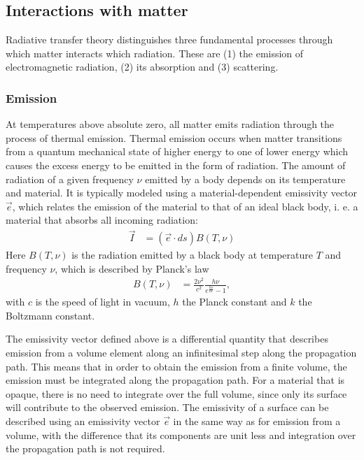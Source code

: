 \subsection{Interactions with matter}

Radiative transfer theory distinguishes three fundamental processes through which
matter interacts which radiation. These are  (1) the emission of electromagnetic radiation, (2) its absorption and (3) scattering.

\subsubsection{Emission}

At temperatures above absolute zero, all matter emits radiation through the
process of thermal emission. Thermal emission occurs when matter transitions
from a quantum mechanical state of higher energy to one of lower energy which
causes the excess energy to be emitted in the form of radiation. The amount of
radiation of a given frequency $\nu$ emitted by a body depends on its
temperature and material. It is typically modeled using a material-dependent
emissivity vector $\vec{e}$, which relates the emission of the material to that
of an ideal black body, i. e. a material that absorbs all incoming radiation:
 \begin{align}
   \label{eq:emissivity}
   \vec{I} &= (\vec{e} \cdot ds) B(T, \nu)
 \end{align}
 Here $B(T, \nu)$ is the radiation emitted by a black body at temperature $T$
 and frequency $\nu$, which is described by Planck's law
 \begin{align}
   B(T, \nu) &= \frac{2 \nu^2}{c^2}\frac{h\nu}{e^{\frac{h\nu}{k T}} - 1},
 \end{align}
 with $c$ is the speed of light in vacuum, $h$  the Planck constant and $k$
 the Boltzmann constant.

The emissivity vector defined above is a differential quantity that describes
emission from a volume element along an infinitesimal step along the propagation
path. This means that in order to obtain the emission from a finite volume, the
emission must be integrated along the propagation path. For a material that is
opaque, there is no need to integrate over the full volume, since only its
surface will contribute to the observed emission. The emissivity of a surface
can be described using an emissivity vector $\vec{e}$ in the same way as for
emission from a volume, with the difference that its components are unit less
and integration over the propagation path is not required.

